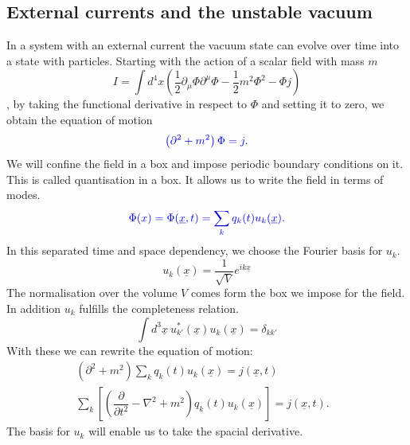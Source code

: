 \documentclass[12pt, titlepage]{article}
\begin{document}
\subsection{External currents and the unstable vacuum}
In a system with an external current the vacuum state can evolve over time into a state with particles.
Starting with the action of a scalar field with mass $ m $
\begin{equation}
I=
\int d^{4}x 
\left(
\frac{1}{2}\partial_{\mu}\Phi\partial^{\mu}\Phi
-\frac{1}{2}m^{2}\Phi^{2}
-\Phi j
 \right)
\end{equation}
, by taking the functional derivative in respect to $ \Phi $ and setting it to zero, we obtain the equation of motion
\begin{equation}\label{motion_scalar}
\textcolor[RGB]{0,0,204}{
\left(
\partial^{2}+m^{2}
 \right)\Phi
 =j
 .}
\end{equation}
We will confine the field in a box and impose periodic boundary conditions on it. This is called quantisation in a box. It allows us to write the field in terms of modes.
\begin{equation}\label{box_quanta}
\textcolor[RGB]{0,0,204}{
\Phi(x) = \Phi (\underline{x},t)= \sum_{k} q_{k}(t)u_{k}(\underline{x})
 .}
\end{equation}
In this separated time and space dependency, we choose the Fourier basis for $ u_{k} $. 
\begin{equation}\label{fourierbasis}
u_{k}(\underline{x})
=
\dfrac{1}{\sqrt{V}} e^{ik\underline{x}}
\end{equation}
The normalisation over the volume $ V $ comes form the box we impose for the field. In addition $ u_{k} $ fulfills the completeness relation.
\begin{equation}\label{compl_relation}
\int d^{3}\underline{x} \ 
u^{\ast}_{k'}(\underline{x})
u_{k}(\underline{x})
=
\delta_{kk'}
\end{equation}
With these we can rewrite the equation of motion:
\begin{subequations}
\begin{align}
\left(
\partial^{2}+m^{2}
 \right)
 \sum_{k} q_{k}(t)u_{k}(\underline{x})
 =j(\underline{x},t)
	&\\
 \sum_{k}
 \left[ 
	\left( 
	\dfrac{\partial}{\partial t^{2}}
	-\nabla^{2}
	+m^{2}
	\right)  
	q_{k}(t)u_{k}(\underline{x})
 \right] 
 =j(\underline{x},t).
\end{align}
\end{subequations}
The basis for $ u_{k} $ will enable us to take the spacial derivative.
\end{document}
